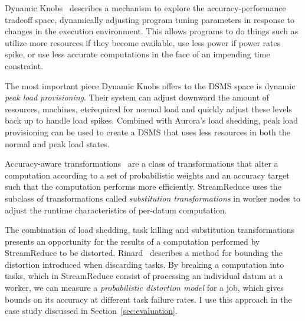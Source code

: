 \documentclass[12pt,twocolumn]{article}
\begin{document}
Dynamic Knobs~\cite{Hoffmann:2011:DKR:1950365.1950390} describes a mechanism to
explore the
accuracy-performance tradeoff space, dynamically adjusting program tuning parameters in
response
to changes in the execution environment. This allows programs to do things such as
utilize more resources if they become available, use less power if power rates spike,
or use less accurate computations in the face of an impending time constraint.

The most important piece Dynamic Knobs offers to the DSMS space is dynamic
\emph{peak load provisioning}. Their system can adjust downward the amount of resources,
machines, etc\. required for normal load and quickly adjust these levels back up to
handle load spikes. Combined with Aurora's load shedding, peak load provisioning can
be used to create a DSMS that uses less resources in both the normal and peak load
states.

Accuracy-aware transformations~\cite{Zhu:2012:RAP:2103656.2103710} are a class of
transformations
that alter a computation according to a set of probabilistic weights and an accuracy
target such that the computation performs more efficiently. StreamReduce uses the subclass
of transformations called \emph{substitution transformations} in worker nodes to adjust
the runtime characteristics of per-datum computation.

The combination of load shedding, task killing and substitution transformations presents
an opportunity for the results of a computation performed by StreamReduce to be distorted.
Rinard~\cite{Rinard:2006:PAB:1183401.1183447} describes a method for bounding the
distortion
introduced when discarding tasks. By breaking a computation into tasks, which in
StreamReduce
consist of processing an individual datum at a worker, we can measure a
\emph{probabilistic distortion model} for a job, which gives bounds on its accuracy at
different
task failure rates. I use this approach in the case study discussed in
Section~\ref{sec:evaluation}.
\end{document}
